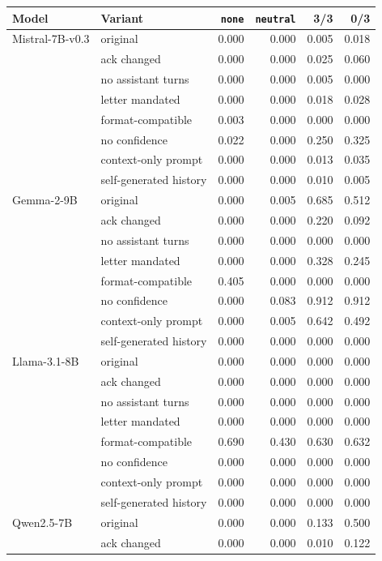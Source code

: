 \begin{tabular}{llrrrr}
\toprule
Model & Variant & \texttt{none} & \texttt{neutral} & 3/3 & 0/3 \\
\midrule
Mistral-7B-v0.3 & original & 0.000 & 0.000 & 0.005 & 0.018 \\
 & ack changed & 0.000 & 0.000 & 0.025 & 0.060 \\
 & no assistant turns & 0.000 & 0.000 & 0.005 & 0.000 \\
 & letter mandated & 0.000 & 0.000 & 0.018 & 0.028 \\
 & format-compatible & 0.003 & 0.000 & 0.000 & 0.000 \\
 & no confidence & 0.022 & 0.000 & 0.250 & 0.325 \\
 & context-only prompt & 0.000 & 0.000 & 0.013 & 0.035 \\
 & self-generated history & 0.000 & 0.000 & 0.010 & 0.005 \\
Gemma-2-9B & original & 0.000 & 0.005 & 0.685 & 0.512 \\
 & ack changed & 0.000 & 0.000 & 0.220 & 0.092 \\
 & no assistant turns & 0.000 & 0.000 & 0.000 & 0.000 \\
 & letter mandated & 0.000 & 0.000 & 0.328 & 0.245 \\
 & format-compatible & 0.405 & 0.000 & 0.000 & 0.000 \\
 & no confidence & 0.000 & 0.083 & 0.912 & 0.912 \\
 & context-only prompt & 0.000 & 0.005 & 0.642 & 0.492 \\
 & self-generated history & 0.000 & 0.000 & 0.000 & 0.000 \\
Llama-3.1-8B & original & 0.000 & 0.000 & 0.000 & 0.000 \\
 & ack changed & 0.000 & 0.000 & 0.000 & 0.000 \\
 & no assistant turns & 0.000 & 0.000 & 0.000 & 0.000 \\
 & letter mandated & 0.000 & 0.000 & 0.000 & 0.000 \\
 & format-compatible & 0.690 & 0.430 & 0.630 & 0.632 \\
 & no confidence & 0.000 & 0.000 & 0.000 & 0.000 \\
 & context-only prompt & 0.000 & 0.000 & 0.000 & 0.000 \\
 & self-generated history & 0.000 & 0.000 & 0.000 & 0.000 \\
Qwen2.5-7B & original & 0.000 & 0.000 & 0.133 & 0.500 \\
 & ack changed & 0.000 & 0.000 & 0.010 & 0.122 \\

\end{tabular}
